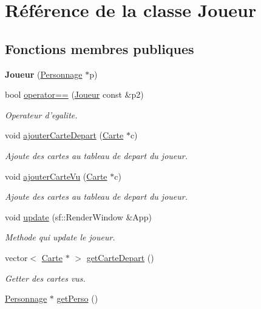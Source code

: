 \hypertarget{classJoueur}{\section{\-Référence de la classe \-Joueur}
\label{classJoueur}
}
\subsection*{\-Fonctions membres publiques}
\begin{DoxyCompactItemize}
\item 
\hypertarget{classJoueur_ab45361d82a16b0a7ed98eb60de042869}{{\bfseries \-Joueur} (\hyperlink{classPersonnage}{\-Personnage} $\ast$p)}\label{classJoueur_ab45361d82a16b0a7ed98eb60de042869}

\item 
bool \hyperlink{classJoueur_aad26191834416db216c91ae6e3139d5c}{operator==} (\hyperlink{classJoueur}{\-Joueur} const \&p2)
\begin{DoxyCompactList}\small\item\em \-Operateur d'egalite. \end{DoxyCompactList}\item 
void \hyperlink{classJoueur_a500c9f3b5901d65093e294a451e462f5}{ajouter\-Carte\-Depart} (\hyperlink{classCarte}{\-Carte} $\ast$c)
\begin{DoxyCompactList}\small\item\em \-Ajoute des cartes au tableau de depart du joueur. \end{DoxyCompactList}\item 
void \hyperlink{classJoueur_a2bd5750fd43f489a3ed03aea01eb6e2e}{ajouter\-Carte\-Vu} (\hyperlink{classCarte}{\-Carte} $\ast$c)
\begin{DoxyCompactList}\small\item\em \-Ajoute des cartes au tableau de depart du joueur. \end{DoxyCompactList}\item 
\hypertarget{classJoueur_a76219fe05bcb3bf5bd42f651a1a3c882}{void \hyperlink{classJoueur_a76219fe05bcb3bf5bd42f651a1a3c882}{update} (sf\-::\-Render\-Window \&\-App)}\label{classJoueur_a76219fe05bcb3bf5bd42f651a1a3c882}

\begin{DoxyCompactList}\small\item\em \-Methode qui update le joueur. \end{DoxyCompactList}\item 
vector$<$ \hyperlink{classCarte}{\-Carte} $\ast$ $>$ \hyperlink{classJoueur_a60ec34b2d62e887fe0e56809b28c9c87}{get\-Carte\-Depart} ()
\begin{DoxyCompactList}\small\item\em \-Getter des cartes vus. \end{DoxyCompactList}\item 
\hypertarget{classJoueur_a255c6e4dc5071a176055ec819080b6d6}{\hyperlink{classPersonnage}{\-Personnage} $\ast$ \hyperlink{classJoueur_a255c6e4dc5071a176055ec819080b6d6}{get\-Perso} ()}\label{classJoueur_a255c6e4dc5071a176055ec819080b6d6}


\end{DoxyCompactItemize}
